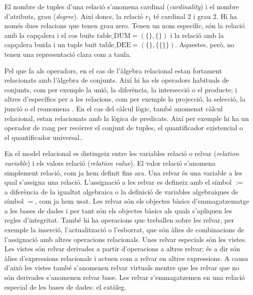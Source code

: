 El nombre de tuples d'una relació s'anomena cardinal
(\emph{cardinality}) i el nombre d'atributs, grau
(\emph{degree}). Així doncs, la relació $r_1$ té cardinal 2 i grau 2.
Hi ha només dues relacions que tenen grau zero. Tenen un nom
específic, són la relació amb la capçalera i el cos buits
$\text{table\_DUM} = (\{\},\{\})$ i la relació amb la capçalera buida
i un tuple buit $\text{table\_DEE} = (\{\},\{\{\}\})$. Aquestes, però, no
tenen una representació clara com a taula.  



Pel que fa als operadors, en el cas de l'àlgebra relacional estan
fortament relacionats amb l'àlgebra de conjunts. Així hi ha els
operadors habituals de conjunts, com per exemple la unió, la
diferència, la intersecció o el producte; i altres d'específics per a
les relacions, com per exemple la projecció, la selecció, la junció o
el reanomena \parencite[cap.~7]{date04:introduction8}.  En el cas del
càlcul lògic, també anomenat càlcul relacional, estan relacionats amb
la lògica de predicats. Així per exemple hi ha un operador de rang per
recórrer el conjunt de tuples, el quantificador existencial o el
quantificador universal.\parencite[cap.~8]{date04:introduction8}.



En el model relacional es distingeix entre les variables relació o
relvar (\emph{relation variable}) i els valors relació (\emph{relation
  value}). El valor relació s'anomena simplement relació, com ja hem
definit fins ara.  Una relvar és una variable a les qual s'assigna una
relació.  L'assignació a les relvar es defineix amb el símbol $:=$ a
diferència de la igualtat algebraica o la definició de variables
algebraiques de símbol $=$, com ja hem usat.  Les relvar són els
objectes bàsics d'emmagatzematge a les bases de dades i per tant són
els objectes bàsics als quals s'apliquen les regles
d'integritat. També hi ha operacions que treballen sobre les relvar,
per exemple la inserció, l'actualització o l'esborrat, que són àlies
de combinacions de l'assignació amb altres operacions relacionals.
Unes relvar especials són les vistes. Les vistes són relvar derivades
a partir d'operacions a altres relvar; és a dir són àlies
d'expressions relacionals i actuen com a relvar en altres
expressions. A causa d'això les vistes també s'anomenen relvar
virtuals mentre que les relvar que no són derivades s'anomenen relvar
base. Les relvar s'emmagatzemen en una relació especial de les bases
de dades: el catàleg.






